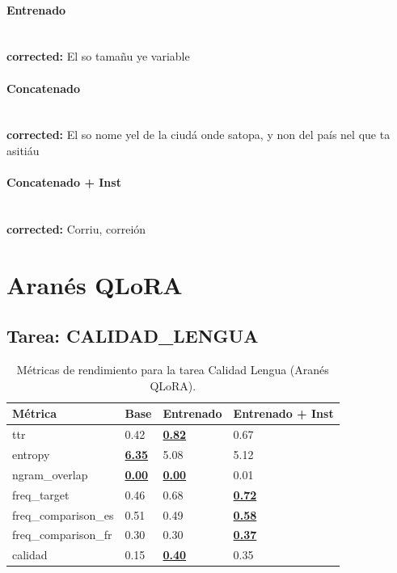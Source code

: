 \paragraph{Entrenado}~\\
\textbf{corrected:} El so tamañu ye variable

\paragraph{Concatenado}~\\
\textbf{corrected:} El so nome ye\textquotesingle{}l de la ciudá onde s\textquotesingle{}atopa, y non del país nel que ta asitiáu

\paragraph{Concatenado + Inst}~\\
\textbf{corrected:} Corriu, correión

\vspace{1em}

\section{Aranés QLoRA}

\subsection{Tarea: CALIDAD\_LENGUA}\label{tarea-calidad_lengua}
\begin{longtable}[]{@{}llll@{}}
\toprule\noalign{}
Métrica & Base & Entrenado & Entrenado + Inst \\
\midrule\noalign{}
\endhead
\bottomrule\noalign{}
\caption{Métricas de rendimiento para la tarea Calidad Lengua (Aranés QLoRA).}
\label{tab:metricas_calidad_lengua_Aranés QLoRA}
\endlastfoot
ttr & 0.42 & \textbf{\underline{0.82}} & 0.67 \\
entropy & \textbf{\underline{6.35}} & 5.08 & 5.12 \\
ngram\_overlap & \textbf{\underline{0.00}} & \textbf{\underline{0.00}} & 0.01 \\
freq\_target & 0.46 & 0.68 & \textbf{\underline{0.72}} \\
freq\_comparison\_es & 0.51 & 0.49 & \textbf{\underline{0.58}} \\
freq\_comparison\_fr & 0.30 & 0.30 & \textbf{\underline{0.37}} \\
calidad & 0.15 & \textbf{\underline{0.40}} & 0.35 \\
\end{longtable}

